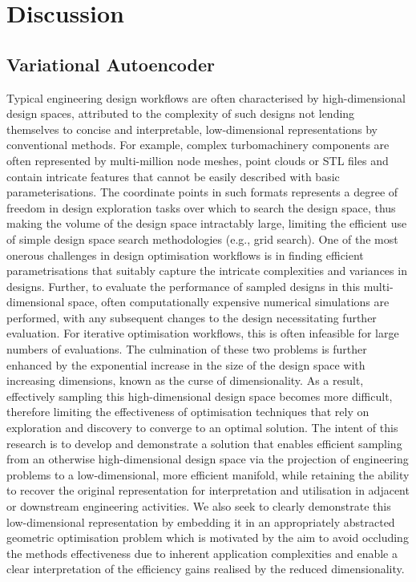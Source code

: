 \documentclass{article}
\begin{document}
\newpage{}

\section{Discussion}
\subsection{Variational Autoencoder}
Typical engineering design workflows are often characterised by high-dimensional design spaces, attributed to the complexity of such designs not lending themselves to concise and interpretable, low-dimensional representations by conventional methods. For example, complex turbomachinery components are often represented by multi-million node meshes, point clouds or STL files and contain intricate features that cannot be easily described with basic parameterisations. The coordinate points in such formats represents a degree of freedom in design exploration tasks over which to search the design space, thus making the volume of the design space intractably large, limiting the efficient use of simple design space search methodologies (e.g., grid search). One of the most onerous challenges in design optimisation workflows is in finding efficient parametrisations that suitably capture the intricate complexities and variances in designs. Further, to evaluate the performance of sampled designs in this multi-dimensional space, often computationally expensive numerical simulations are performed, with any subsequent changes to the design necessitating further evaluation. For iterative optimisation workflows, this is often infeasible for large numbers of evaluations. The culmination of these two problems is further enhanced by the exponential increase in the size of the design space with increasing dimensions, known as the curse of dimensionality. As a result, effectively sampling this high-dimensional design space becomes more difficult, therefore limiting the effectiveness of optimisation techniques that rely on exploration and discovery to converge to an optimal solution.
The intent of this research is to develop and demonstrate a solution that enables efficient sampling from an otherwise high-dimensional design space via the projection of engineering problems to a low-dimensional, more efficient manifold, while retaining the ability to recover the original representation for interpretation and utilisation in adjacent or downstream engineering activities. We also seek to clearly demonstrate this low-dimensional representation by embedding it in an appropriately abstracted geometric optimisation problem which is motivated by the aim to avoid occluding the methods effectiveness due to inherent application complexities and enable a clear interpretation of the efficiency gains realised by the reduced dimensionality.
\end{document}
